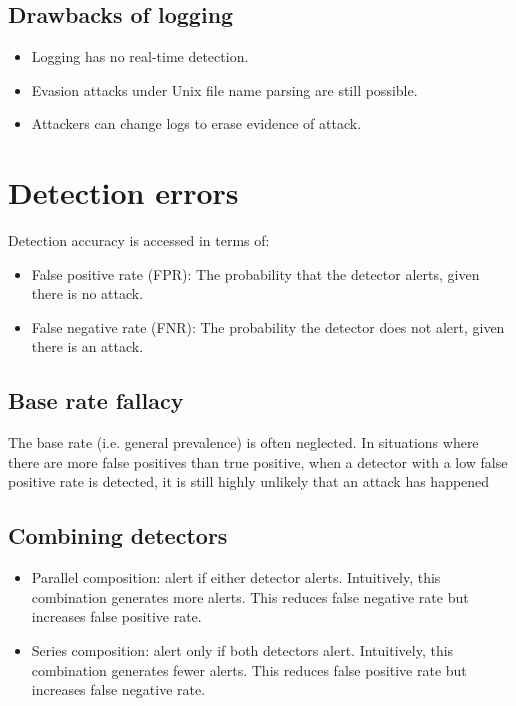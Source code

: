 \subsection{Drawbacks of logging}
\begin{itemize}
    \item Logging has no real-time detection.
    \item Evasion attacks under Unix file name parsing are still possible.
    \item Attackers can change logs to erase evidence of attack.
\end{itemize}

\section{Detection errors}
Detection accuracy is accessed in terms of:
\begin{itemize}
    \item False positive rate (FPR): The probability that the detector alerts, given there is no attack.
    \item False negative rate (FNR): The probability the detector does not alert, given there is an attack.
\end{itemize}

\subsection{Base rate fallacy}
The base rate (i.e. general prevalence) is often neglected. In situations where there are more false positives than true positive, when a detector with a low false positive rate is detected, it is still highly unlikely that an attack has happened

\subsection{Combining detectors}
\begin{itemize}
    \item Parallel composition: alert if either detector alerts. Intuitively, this combination generates more alerts. This reduces false negative rate but increases false positive rate.
    
    \item Series composition: alert only if both detectors alert. Intuitively, this combination generates fewer alerts. This reduces false positive rate but increases false negative rate.
\end{itemize}

